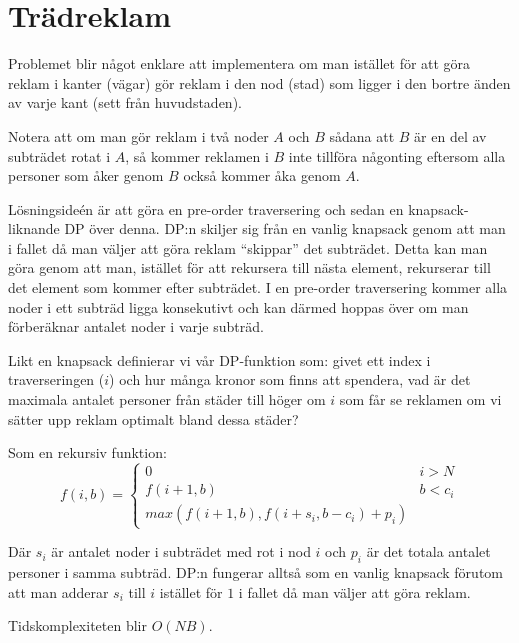 \section*{Trädreklam}
	
	Problemet blir något enklare att implementera om man istället för att göra reklam i kanter (vägar) gör reklam i den nod
	(stad) som ligger i den bortre änden av varje kant (sett från huvudstaden).
	
  Notera att om man gör reklam i två noder $A$ och $B$ sådana att $B$ är en del av subträdet rotat i $A$, så kommer reklamen i $B$ inte
	tillföra någonting eftersom alla personer som åker genom $B$ också kommer åka genom $A$.
	
	Lösningsideén är att göra en pre-order traversering och sedan en knapsack-liknande DP över denna. DP:n skiljer sig
	från en vanlig knapsack genom att man i fallet då man väljer att göra reklam ``skippar'' det subträdet.
	Detta kan man göra genom att man, istället för att rekursera till nästa element, rekurserar till det element som kommer
	efter subträdet. I en pre-order traversering kommer alla noder i ett subträd ligga konsekutivt
	och kan därmed hoppas över om man förberäknar antalet noder i varje subträd.
	
	Likt en knapsack definierar vi vår DP-funktion som: givet ett index i traverseringen ($i$) och hur många kronor som
	finns att spendera, vad är det maximala antalet personer från städer till höger om $i$ som får se reklamen om vi
	sätter upp reklam optimalt bland dessa städer?
	
	Som en rekursiv funktion:
	\[
	f(i, b) =
		\begin{cases} 
		0 & i > N \\
		f(i + 1, b) & b < c_i \\
		max(f(i + 1, b), f(i + s_i, b - c_i) + p_i) & 
		\end{cases}
	\]
	
	Där $s_i$ är antalet noder i subträdet med rot i nod $i$ och $p_i$ är det totala antalet personer i samma subträd.
	DP:n fungerar alltså som en vanlig knapsack förutom att man adderar $s_i$ till $i$ istället för $1$ i fallet
	då man väljer att göra reklam.
	
	Tidskomplexiteten blir $O(NB)$.
